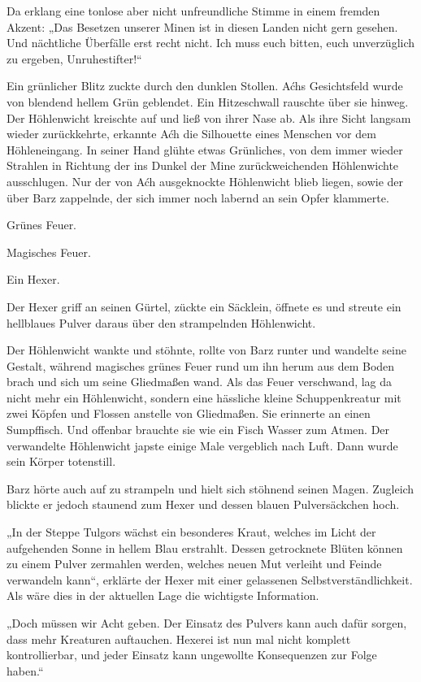Da erklang eine tonlose aber nicht unfreundliche Stimme in einem fremden Akzent: „Das Besetzen unserer Minen ist in diesen Landen nicht gern gesehen. Und nächtliche Überfälle erst recht nicht. Ich muss euch bitten, euch unverzüglich zu ergeben, Unruhestifter!“

Ein grünlicher Blitz zuckte durch den dunklen Stollen. Aćhs Gesichtsfeld wurde von blendend hellem Grün geblendet. Ein Hitzeschwall rauschte über sie hinweg. Der Höhlenwicht kreischte auf und ließ von ihrer Nase ab. Als ihre Sicht langsam wieder zurückkehrte, erkannte Aćh die Silhouette eines Menschen vor dem Höhleneingang. In seiner Hand glühte etwas Grünliches, von dem immer wieder Strahlen in Richtung der ins Dunkel der Mine zurückweichenden Höhlenwichte ausschlugen. Nur der von Aćh ausgeknockte Höhlenwicht blieb liegen, sowie der über Barz zappelnde, der sich immer noch labernd an sein Opfer klammerte.

Grünes Feuer.

Magisches Feuer.

Ein Hexer.

Der Hexer griff an seinen Gürtel, zückte ein Säcklein, öffnete es und streute ein hellblaues Pulver daraus über den strampelnden Höhlenwicht.

Der Höhlenwicht wankte und stöhnte, rollte von Barz runter und wandelte seine Gestalt, während magisches grünes Feuer rund um ihn herum aus dem Boden brach und sich um seine Gliedmaßen wand. Als das Feuer verschwand, lag da nicht mehr ein Höhlenwicht, sondern eine hässliche kleine Schuppenkreatur mit zwei Köpfen und Flossen anstelle von Gliedmaßen. Sie erinnerte an einen Sumpffisch. Und offenbar brauchte sie wie ein Fisch Wasser zum Atmen. Der verwandelte Höhlenwicht japste einige Male vergeblich nach Luft. Dann wurde sein Körper totenstill.

Barz hörte auch auf zu strampeln und hielt sich stöhnend seinen Magen. Zugleich blickte er jedoch staunend zum Hexer und dessen blauen Pulversäckchen hoch.

„In der Steppe Tulgors wächst ein besonderes Kraut, welches im Licht der aufgehenden Sonne in hellem Blau erstrahlt. Dessen getrocknete Blüten können zu einem Pulver zermahlen werden, welches neuen Mut verleiht und Feinde verwandeln kann“, erklärte der Hexer mit einer gelassenen Selbstverständlichkeit. Als wäre dies in der aktuellen Lage die wichtigste Information.

„Doch müssen wir Acht geben. Der Einsatz des Pulvers kann auch dafür sorgen, dass mehr Kreaturen auftauchen. Hexerei ist nun mal nicht komplett kontrollierbar, und jeder Einsatz kann ungewollte Konsequenzen zur Folge haben.“

